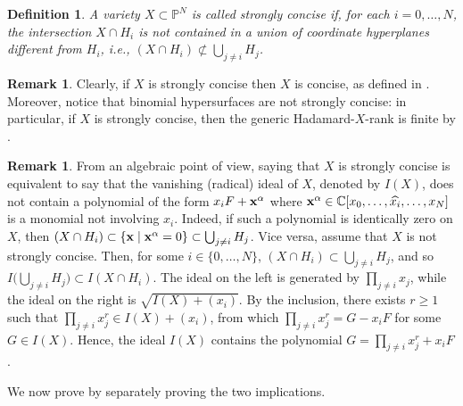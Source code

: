\documentclass{amsart}
\theoremstyle{plain}
\numberwithin{theorem}{section}
\newtheorem{definition}[theorem]{Definition}
\theoremstyle{definition}
\newtheorem{remark}[theorem]{Remark}
\newcommand{\bbC}{\mathbb{C}}
\newcommand{\bbP}{\mathbb{P}}
\begin{document}
\begin{definition}
\label{def:strongly_concise}
    A variety $X \subset \bbP^N$ is called {\em strongly concise} if, for each $i = 0,\ldots,N$, the intersection $X \cap H_i$ is not contained in a union of coordinate hyperplanes different from $H_i$, i.e., $(X\cap H_i) \not\subset \bigcup_{j\neq i}H_j$. 
\end{definition}

\begin{remark}
\label{rmk:strong->generic_finite}
    Clearly, if $X$ is strongly concise then $X$ is concise, as defined in  . Moreover, notice that binomial hypersurfaces are not strongly concise: in particular, if $X$ is strongly concise, then the generic Hadamard-$X$-rank is finite by .
\end{remark}

\begin{remark}
\label{rem:strongly_concise_ideal}
    From an algebraic point of view, saying that $X$ is strongly concise is equivalent to say that the vanishing (radical) ideal of $X$, denoted by $I(X)$, does not contain a polynomial of the form $x_iF + {\bf x}^\alpha$ where ${\bf x}^{\alpha} \in \bbC[x_0,\ldots,\widehat{x_i},\ldots,x_N]$ is a monomial not involving $x_i$. Indeed, if such a polynomial is identically zero on $X$, then $(X \cap H_i) \subset \{{\bf x} \mid {\bf x}^\alpha = 0\} \subset \bigcup_{j\neq i}H_j$. Vice versa, assume that $X$ is not strongly concise. Then, for some $i \in \{0,\ldots,N\}$, $(X \cap H_i) \subset \bigcup_{j \neq i} H_j$, and so $I\Big(\bigcup_{j \neq i} H_j\Big) \subset I(X \cap H_i)$. The ideal on the left is generated by $\prod_{j\neq i} x_j$, while the ideal on the right is $\sqrt{I(X) + (x_i)}$. By the inclusion, there exists $r \geq 1$ such that $\prod_{j\neq i}x_j^r \in I(X) + (x_i)$, from which $\prod_{j\neq i}x_j^r = G - x_iF$ for some $G \in I(X)$. Hence, the ideal $I(X)$ contains the polynomial $G = \prod_{j\neq i}x_j^r + x_i F$.
\end{remark}

We now prove  by separately proving the two implications.
\end{document}
